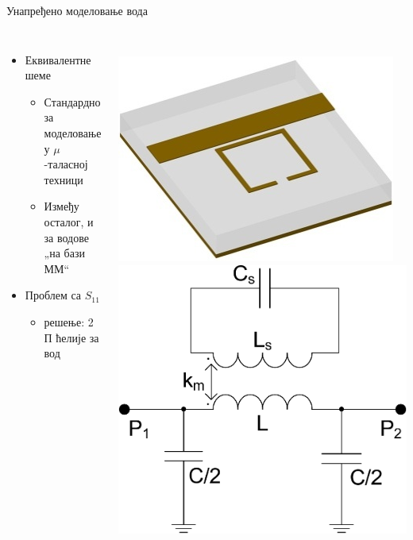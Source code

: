 \documentclass{beamer}
\begin{document}
\begin{frame}[t]{Унапређено моделовање вода}

    \begin{columns}[c]
    \begin{itemize}
        \item Еквивалентне шеме
            \begin{itemize}
                \item Стандардно за моделовање у $\mu$-таласној техници
                    \item Између осталог, и за водове „на бази ММ``
            \end{itemize}
        \item Проблем са $S_{11}$
            \begin{itemize}
                \item решење: 2 П ћелије за вод
            \end{itemize}
    \end{itemize}\\[0.75cm]
    \centering
    \includegraphics[width=0.7\linewidth]{sl_ekv/fig3c}
\centering    
\includegraphics[scale=0.22]{sl_ekv/fig2a}\\[0.5cm]

\end{columns}
\end{frame}
\end{document}
